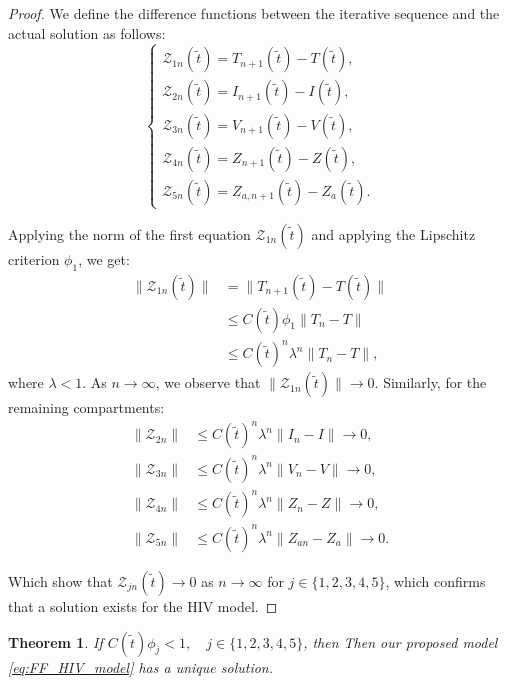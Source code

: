 \documentclass{article}
\theoremstyle{plain}
\newtheorem{theorem}{Theorem}[section]
\theoremstyle{definition}
\numberwithin{equation}{section}
\begin{document}
\begin{proof}
	We define the difference functions between the iterative sequence and the actual solution as follows:
	\begin{equation*}
		\begin{cases}
			\mathcal{Z}_{1n}(\tilde{t}) = T_{n+1}(\tilde{t}) - T(\tilde{t}), \\
			\mathcal{Z}_{2n}(\tilde{t}) = I_{n+1}(\tilde{t}) - I(\tilde{t}), \\
			\mathcal{Z}_{3n}(\tilde{t}) = V_{n+1}(\tilde{t}) - V(\tilde{t}), \\
			\mathcal{Z}_{4n}(\tilde{t}) = Z_{n+1}(\tilde{t}) - Z(\tilde{t}), \\
			\mathcal{Z}_{5n}(\tilde{t}) = Z_{a,n+1}(\tilde{t}) - Z_{a}(\tilde{t}).
		\end{cases}
	\end{equation*}
	
	Applying the norm of the first equation $\mathcal{Z}_{1n}(\tilde{t})$ and applying the Lipschitz criterion $\phi_1$, we get:
	\begin{align*}
		\|\mathcal{Z}_{1n}(\tilde{t})\| &= \|T_{n+1}(\tilde{t}) - T(\tilde{t})\| \\
		&\leq C(\tilde{t}) \phi_1 \|T_n - T\| \\
		&\leq C(\tilde{t})^n \lambda^n \|T_n - T\|,
	\end{align*}
	where $\lambda < 1$. As $n \to \infty$, we observe that $\|\mathcal{Z}_{1n}(\tilde{t})\| \to 0$. Similarly, for the remaining compartments:
	\begin{align*}
		\|\mathcal{Z}_{2n}\| &\leq C(\tilde{t})^n \lambda^n \|I_n - I\| \to 0, \\
		\|\mathcal{Z}_{3n}\| &\leq C(\tilde{t})^n \lambda^n \|V_n - V\| \to 0, \\
		\|\mathcal{Z}_{4n}\| &\leq C(\tilde{t})^n \lambda^n \|Z_n - Z\| \to 0, \\
		\|\mathcal{Z}_{5n}\| &\leq C(\tilde{t})^n \lambda^n \|Z_{an} - Z_a\| \to 0.
	\end{align*}
	
	Which show that $\mathcal{Z}_{jn}(\tilde{t}) \to 0$ as $n \to \infty$ for $j \in \{1, 2, 3, 4, 5\}$, which confirms that a solution exists for the HIV model.
\end{proof}
\begin{theorem}
	If $C(\tilde{t}) \phi_j < 1, \quad j \in \{1, 2, 3, 4, 5\}$, then Then our proposed model \eqref{eq:FF_HIV_model} has a unique solution.
\end{theorem}
\end{document}

